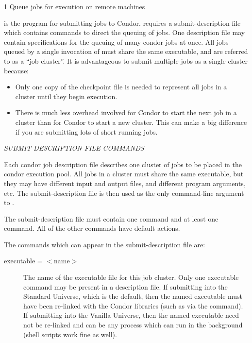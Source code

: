 \begin{ManPage}{\label{man-condor-submit}}{1}
{Queue jobs for execution on remote machines}
\Synopsis {}
\oOpt{--}


\Description

 is the program for submitting jobs to Condor.
 requires a submit-description file which contains commands
to direct the queuing of jobs. One description file may contain
specifications for the queuing of many condor jobs at once. All jobs queued by a
single invocation of  must share the same executable, and
are referred to as a ``job cluster''. It is advantageous to submit
multiple jobs as a single cluster because:
\begin{itemize}
\item Only one copy of the checkpoint file is needed to 
represent all jobs in a cluster until they begin execution.
\item There is much less overhead involved for Condor to start the next
job in a cluster than for Condor to start a new cluster.  This can make
a big difference if you are submitting lots of short running jobs.
\end{itemize}

\emph{SUBMIT DESCRIPTION FILE COMMANDS}

Each condor job description file describes one cluster of jobs to be
placed in the condor execution pool. All jobs in a cluster must share
the same executable, but they may have different input and output files,
and different program arguments, etc. The submit-description file is then
used as the only command-line argument to . 

The submit-description file must contain one  command and at least one
 command.  All of the other commands have default actions.

The commands which can appear in the submit-description file are:

\begin{description} 


\item[executable = $<$name$>$]The name of the executable file for this
job cluster. Only one executable command may be present in a description
file. If submitting into the Standard Universe, which is the default,
then the named executable must have been re-linked with the Condor
libraries (such as via the  command). If submitting into
the Vanilla Universe, then the named executable need not be re-linked and
can be any process which can run in the background (shell scripts work
fine as well). 


\end{description}
\end{ManPage}
